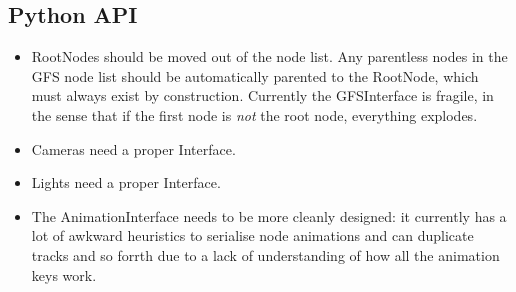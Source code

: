 \documentclass{article}
\begin{document}
\subsection{Python API}
\begin{itemize}
\item RootNodes should be moved out of the node list. Any parentless nodes in the GFS node list should be automatically parented to the RootNode, which must always exist by construction. Currently the GFSInterface is fragile, in the sense that if the first node is \textit{not} the root node, everything explodes.
\item Cameras need a proper Interface.
\item Lights need a proper Interface.
\item The AnimationInterface needs to be more cleanly designed: it currently has a lot of awkward heuristics to serialise node animations and can duplicate tracks and so forrth due to a lack of understanding of how all the animation keys work.
\end{itemize}
\end{document}
